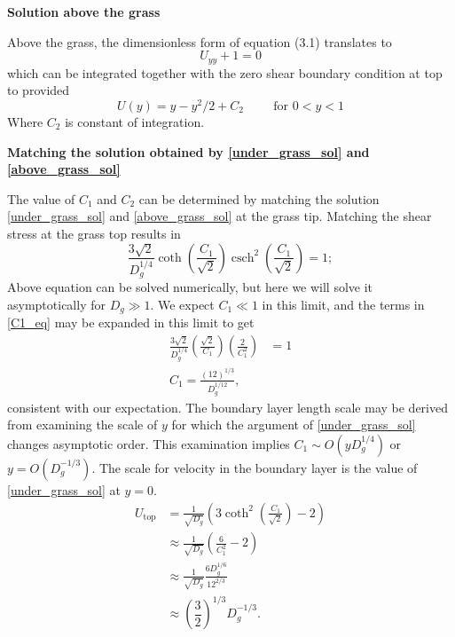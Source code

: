 \documentclass[letterpaper,10pt]{article}
\DeclareMathOperator{\csch}{csch}
\begin{document}
\vspace{2mm}
\noindent
\textbf{Solution above the grass}
\vspace{1mm}

\noindent
Above the grass, the dimensionless form of equation (3.1) translates to
\begin{equation}
 U_{yy}+1=0
\end{equation}
which can be integrated together with the zero shear boundary condition at top to provided
\begin{equation}
 U(y) = y-y^2/2+C_2 \hspace{1cm} \text{for $0<y<1$}
 \label{above_grass_sol}
\end{equation}
Where $C_2$ is constant of integration.

\vspace{2mm}
\noindent
\textbf{Matching the solution obtained by \eqref{under_grass_sol} and \eqref{above_grass_sol} }
\vspace{1mm}

\noindent
The value of $C_1$ and $C_2$ can be determined by matching the solution \eqref{under_grass_sol} and \eqref{above_grass_sol} at the grass tip.
Matching the shear stress at the grass top results in
\begin{equation}
\frac{3\sqrt{2}}{D_g^{1/4}} \coth\left(\dfrac{C_1}{\sqrt{2}}\right) \csch^2\left(\dfrac{C_1}{\sqrt{2}}\right) = 1;
\label{C1_eq}
\end{equation}
Above equation can be solved numerically, but here we will solve it asymptotically for $D_g \gg 1$. We expect $C_1 \ll 1$ in this limit, and the terms in \eqref{C1_eq} may be expanded in this limit to get
\begin{equation}
\begin{split}
\frac{3\sqrt{2}}{D_g^{1/4}} \left( \frac{\sqrt{2}}{C_1} \right) \left( \frac{2}{C_1^2} \right) &= 1 \\
C_1 = \frac{(12)^{1/3}}{D_g^{1/12}},
\end{split}
\end{equation}
consistent with our expectation.
The boundary layer length scale may be derived from examining the scale of $y$ for which the argument of \eqref{under_grass_sol} changes asymptotic order. This examination implies $C_1 \sim O(y D_g^{1/4})$ or $y = O(D_g^{-1/3})$. The scale for velocity in the boundary layer is the value of \eqref{under_grass_sol} at $y=0$.
\begin{align}
 U_\text{top} &=  \frac{1}{\sqrt{D_g}} \left( 3 \coth^2 \left(\frac{C_1}{\sqrt{2}}  \right)-2    \right) \\
              &\approx  \frac{1}{\sqrt{D_g}} \left( \frac{6}{C_1^2} -2    \right) \\
              &\approx \frac{1}{\sqrt{D_g}} \frac{6D_g^{1/6}}{12^{2/3}} \\
              &\approx \left( \dfrac{3}{2} \right)^{1/3} D_g^{-1/3}.
\end{align}
\end{document}

